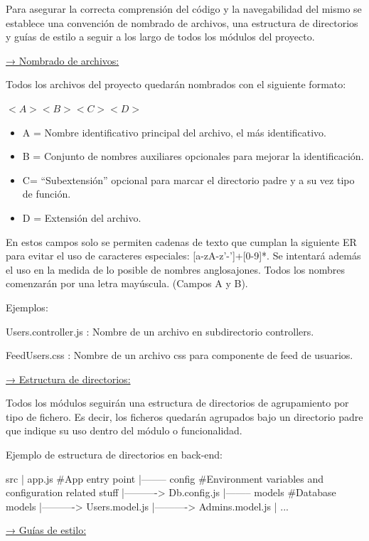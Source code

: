 \documentclass{article}
\begin{document}
Para asegurar la correcta comprensión del código y la navegabilidad del mismo se establece una convención 
de nombrado de archivos, una estructura de directorios y guías de estilo a seguir a los largo de todos los 
módulos del proyecto.

\underline{→ Nombrado de archivos:}

Todos los archivos del proyecto quedarán nombrados con el siguiente formato:

$<A><B><C><D>$

\begin{itemize}
    \setlength{\itemsep}{0em} %
    \item A = Nombre identificativo principal del archivo, el más identificativo.
    \item B = Conjunto de nombres auxiliares opcionales para mejorar la identificación.
    \item C= “Subextensión” opcional para marcar el directorio padre y a su vez tipo de función.
    \item D = Extensión del archivo.
\end{itemize}

En estos campos solo se permiten cadenas de texto que cumplan la siguiente ER para evitar el uso de 
caracteres especiales: [a-zA-z'-']+[0-9]*.
Se intentará además el uso en la medida de lo posible de nombres anglosajones.
Todos los nombres comenzarán por una letra mayúscula. (Campos A y B).

Ejemplos: 

Users.controller.js : Nombre de un archivo en subdirectorio controllers.

FeedUsers.css :  Nombre de un archivo css para componente de feed de usuarios.
\pagebreak

\underline{→ Estructura de directorios:}

Todos los módulos seguirán una estructura de directorios de agrupamiento por tipo de fichero. 
Es decir, los ficheros quedarán agrupados bajo un directorio padre que indique su uso dentro del módulo o funcionalidad.

Ejemplo de estructura de directorios en back-end:

src
|	app.js	\#App entry point
|-------- config 	\#Environment variables and configuration related stuff
|----------> Db.config.js
|-------- models \#Database models
|----------> Users.model.js
|----------> Admins.model.js
| ...


\underline{→ Guías de estilo:}
\end{document}
